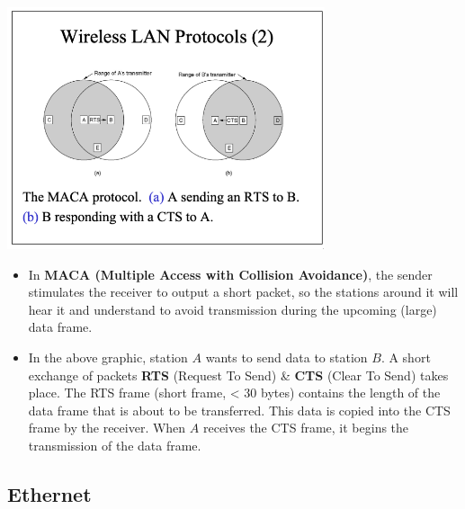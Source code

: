 \documentclass[11pt]{article}
\begin{document}
\begin{center}
    \includegraphics[width=0.7\textwidth]{macaprotocol.png}
\end{center}
\begin{itemize}
    \item   In \textbf{MACA (Multiple Access with Collision Avoidance)}, the sender stimulates the receiver to output 
            a short packet, so the stations around it will hear it and understand to avoid transmission during the 
            upcoming (large) data frame.
    \item   In the above graphic, station $A$ wants to send data to station $B$. 
            A short exchange of packets \textbf{RTS} (Request To Send) \& \textbf{CTS} (Clear To Send) takes place.
            The RTS frame (short frame, < 30 bytes) contains the length of the data frame that is about to be transferred.
            This data is copied into the CTS frame by the receiver.
            When $A$ receives the CTS frame, it begins the transmission of the data frame.
\end{itemize}

\subsection{Ethernet}
\end{document}

